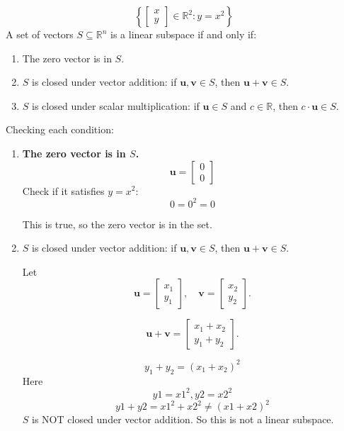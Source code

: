 \[
\left\{
\begin{bmatrix}
x \\ y
\end{bmatrix}
\in \mathbb{R}^2 : y = x^2
\right\}
    \]
A set of vectors \( S \subseteq \mathbb{R}^n \) is a linear subspace if and only if:
\begin{enumerate}
    \item The zero vector is in \( S \).
    \item \( S \) is closed under vector addition: if \( \mathbf{u}, \mathbf{v} \in S \), then \( \mathbf{u} + \mathbf{v} \in S \).
    \item \( S \) is closed under scalar multiplication: if \( \mathbf{u} \in S \) and \( c \in \mathbb{R} \), then \( c \cdot \mathbf{u} \in S \).
\end{enumerate}


Checking each condition:
\begin{enumerate}
    \item \textbf{The zero vector is in \( S \).}
    \[
    \mathbf{u} = 
    \begin{bmatrix} 
    0 \\ 0 
    \end{bmatrix}
    \]
    Check if it satisfies \( y = x^2 \): 
    \[
    0 = 0^2 = 0
    \]

This is true, so the zero vector is in the set.
 \item \( S \) is closed under vector addition: if \( \mathbf{u}, \mathbf{v} \in S \), then \( \mathbf{u} + \mathbf{v} \in S \).


 Let 
    \[
    \mathbf{u} = 
    \begin{bmatrix} 
    x_1 \\ y_1
    \end{bmatrix}, \quad 
    \mathbf{v} = 
    \begin{bmatrix} 
    x_2 \\ y_2
    \end{bmatrix}.
    \]

    \[
    \mathbf{u} + \mathbf{v} = 
    \begin{bmatrix} 
    x_1 + x_2 \\ y_1 + y_2
    \end{bmatrix}.
    \]

    \[
    y_1 + y_2 = (x_1 + x_2)^2
    \]
    Here
    \[
    y1 = x1^2, y2 = x2^2
    \]
    \[
    y1+y2 = x1^2 + x2^2 \neq (x1+x2)^2
    \]
\( S \) is NOT closed under vector addition. So this is not a linear subspace.
    
\end{enumerate}